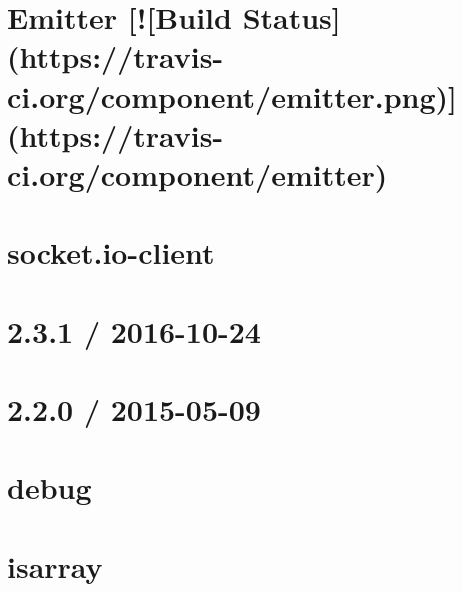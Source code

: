 \documentclass[twoside]{book}
\newcommand{\+}{\discretionary{\mbox{\scriptsize$\hookleftarrow$}}{}{}}
\begin{document}
\chapter{Emitter \mbox{[}!\mbox{[}Build Status\mbox{]}(https\+://travis-\/ci.org/component/emitter.png)\mbox{]}(https\+://travis-\/ci.org/component/emitter)}
\label{md_app_web_node_modules_socket_8io-client_node_modules_component-emitter__readme}

\chapter{socket.\+io-\/client}
\label{md_app_web_node_modules_socket_8io-client__r_e_a_d_m_e}

\chapter{2.3.1 / 2016-\/10-\/24}
\label{md_app_web_node_modules_socket_8io-parser__history}

\chapter{2.2.0 / 2015-\/05-\/09}
\label{md_app_web_node_modules_socket_8io-parser_node_modules_debug__history}

\chapter{debug}
\label{md_app_web_node_modules_socket_8io-parser_node_modules_debug__readme}

\chapter{isarray}
\label{md_app_web_node_modules_socket_8io-parser_node_modules_isarray__r_e_a_d_m_e}

\end{document}
